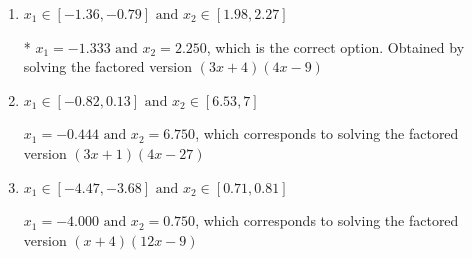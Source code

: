 \documentclass{extbook}[14pt]
\begin{document}
\begin{enumerate}
{\begin{enumerate}[label=\Alph*.]
$x_1 = -2.667 \text{ and } x_2 = 1.125$, which corresponds to solving the factored version $(3x + 8)(4x -4)$
\item \( x_1 \in [-1.36, -0.79] \text{ and } x_2 \in [1.98, 2.27] \)

* $x_1 = -1.333 \text{ and } x_2 = 2.250$, which is the correct option. Obtained by solving the factored version $(3x + 4)(4x -9)$
\item \( x_1 \in [-0.82, 0.13] \text{ and } x_2 \in [6.53, 7] \)

$x_1 = -0.444 \text{ and } x_2 = 6.750$, which corresponds to solving the factored version $(3x + 1)(4x -27)$
\item \( x_1 \in [-4.47, -3.68] \text{ and } x_2 \in [0.71, 0.81] \)

$x_1 = -4.000 \text{ and } x_2 = 0.750$, which corresponds to solving the factored version $(x + 4)(12x -9)$
\end{enumerate}

}
\end{enumerate}
\end{document}
